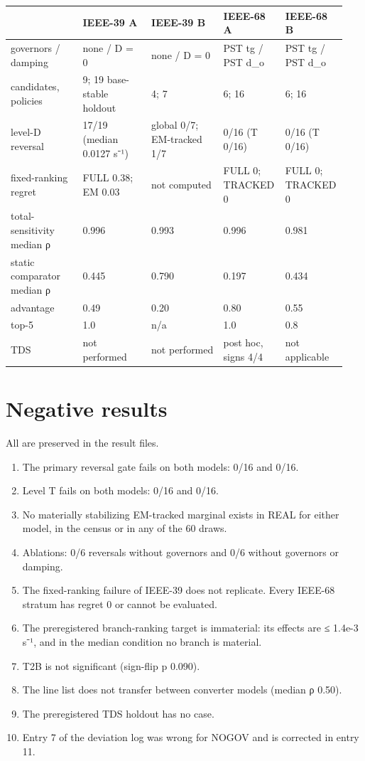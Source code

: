\documentclass[10pt,a4paper]{article}
\begin{document}
{\small
\begin{longtable}{L{0.216\linewidth}L{0.208\linewidth}L{0.216\linewidth}L{0.158\linewidth}L{0.141\linewidth}}
\toprule
\textbf{} & \textbf{IEEE-39 A} & \textbf{IEEE-39 B} & \textbf{IEEE-68 A} & \textbf{IEEE-68 B} \\
\midrule
\endhead
governors / damping & none / D = 0 & none / D = 0 & PST tg / PST d\_o & PST tg / PST d\_o \\
candidates, policies & 9; 19 base-stable holdout & 4; 7 & 6; 16 & 6; 16 \\
level-D reversal & 17/19 (median 0.0127 s⁻¹) & global 0/7; EM-tracked 1/7 & 0/16 (T 0/16) & 0/16 (T 0/16) \\
fixed-ranking regret & FULL 0.38; EM 0.03 & not computed & FULL 0; TRACKED 0 & FULL 0; TRACKED 0 \\
total-sensitivity median ρ & 0.996 & 0.993 & 0.996 & 0.981 \\
static comparator median ρ & 0.445 & 0.790 & 0.197 & 0.434 \\
advantage & 0.49 & 0.20 & 0.80 & 0.55 \\
top-5 & 1.0 & n/a & 1.0 & 0.8 \\
TDS & not performed & not performed & post hoc, signs 4/4 & not applicable \\
\bottomrule
\end{longtable}}
\section{Negative results}
All are preserved in the result files.

\begin{enumerate}
\item The primary reversal gate fails on both models: 0/16 and 0/16.
\item Level T fails on both models: 0/16 and 0/16.
\item No materially stabilizing EM-tracked marginal exists in REAL for either model, in the census or in any of the 60 draws.
\item Ablations: 0/6 reversals without governors and 0/6 without governors or damping.
\item The fixed-ranking failure of IEEE-39 does not replicate. Every IEEE-68 stratum has regret 0 or cannot be evaluated.
\item The preregistered branch-ranking target is immaterial: its effects are ≤ 1.4e-3 s⁻¹, and in the median condition no branch is material.
\item T2B is not significant (sign-flip p 0.090).
\item The line list does not transfer between converter models (median ρ 0.50).
\item The preregistered TDS holdout has no case.
\item Entry 7 of the deviation log was wrong for NOGOV and is corrected in entry 11.
\end{enumerate}
\end{document}
